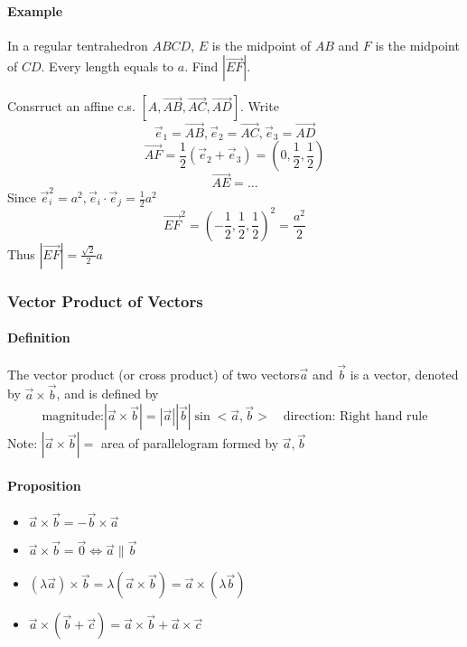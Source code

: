 \documentclass[UTF8]{ctexart}
\begin{document}
\paragraph{Example} In a regular tentrahedron $ABCD$, $E$ is the midpoint of $AB$ and $F$ is the midpoint of $CD$.
Every length equals to $a$. Find $|\overrightarrow{EF}|$.

Consrruct an affine c.s. $[A,\overrightarrow{AB},\overrightarrow{AC},\overrightarrow{AD}]$.
Write 
$$
\vec e_1 = \overrightarrow{AB}, \vec e_2 = \overrightarrow{AC},\vec e_3= \overrightarrow{AD}
$$
$$
\overrightarrow{AF} = \frac{1}{2}(\vec e_2+ \vec e_3)= (0,\frac{1}{2},\frac{1}{2})
$$
$$
\overrightarrow{AE}= ...
$$
Since $\vec e_i^2= a^2, \vec e_i \cdot \vec e_j = \frac{1}{2} a^2$
$$
\overrightarrow{EF}^2= (-\frac{1}{2},\frac{1}{2},\frac{1}{2})^2 = \frac{a^2}{2}
$$
Thus $|\overrightarrow{EF}|= \frac{\sqrt{2}}{2}a$

\subsubsection{Vector Product of Vectors}

\paragraph{Definition}
The vector product (or cross product) of two vectors$\vec a$ and $ \vec b$ is a vector, denoted by $\vec a \times \vec b$,
and is defined by 
$$
\text{magnitude:} |\vec a \times \vec b | = |\vec a| |\vec b| \sin <\vec a,\vec b>  \quad
\text{direction: Right hand rule}
$$
Note: $|\vec a \times \vec b| = $ area of parallelogram formed by $\vec a, \vec b$ 

\paragraph{Proposition}

\begin{itemize}
  \item $\vec a \times \vec b = - \vec b \times \vec a $
  \item $\vec a \times \vec b = \vec 0 \iff \vec a \parallel \vec b$
  \item $(\lambda \vec a)\times \vec b  = \lambda (\vec a \times \vec b) = \vec a \times (\lambda \vec b)$
  \item $\vec a \times (\vec b + \vec c) = \vec a \times \vec b+ \vec a \times \vec c$
\end{itemize}
\end{document}
